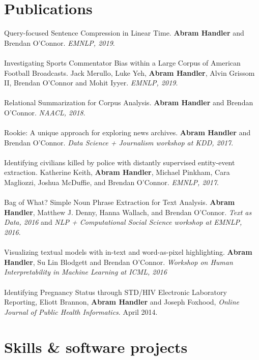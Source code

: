 \documentclass[10pt, a4paper]{article}
\begin{document}
\vspace{-.7cm}

\section*{Publications}

Query-focused Sentence Compression in Linear Time. \textbf{Abram Handler} and Brendan O'Connor. \textit{EMNLP, 2019}.\\ \\
Investigating Sports Commentator Bias within a Large Corpus of American Football Broadcasts. Jack Merullo, Luke Yeh, \textbf{Abram Handler}, Alvin Grissom II, Brendan O'Connor and Mohit Iyyer. \textit{EMNLP, 2019}.\\ \\
Relational Summarization for Corpus Analysis. \textbf{Abram Handler} and Brendan O'Connor. \textit{NAACL, 2018}.\\ \\
Rookie: A unique approach for exploring news archives. \textbf{Abram Handler} and Brendan O'Connor. \textit{Data Science + Journalism workshop at KDD, 2017}.\\ \\
Identifying civilians killed by police with distantly supervised entity-event extraction. Katherine Keith, \textbf{Abram Handler}, Michael Pinkham, Cara Magliozzi, Joshua McDuffie, and Brendan O'Connor. \textit{EMNLP, 2017}. \\ \\
Bag of What? Simple Noun Phrase Extraction for Text Analysis. \textbf{Abram Handler}, Matthew J. Denny, Hanna Wallach, and Brendan O'Connor. \textit{Text as Data, 2016} and \textit{NLP + Computational Social Science workshop at EMNLP, 2016}.\\ \\
Visualizing textual models with in-text and word-as-pixel highlighting.  \textbf{Abram Handler}, Su Lin Blodgett and Brendan O'Connor. \textit{Workshop on Human Interpretability in Machine Learning at ICML, 2016} \\ \\
Identifying Pregnancy Status through STD/HIV Electronic Laboratory Reporting,  Eliott Brannon, \textbf{Abram Handler} and Joseph Foxhood, \textit{Online Journal of Public Health Informatics}. April 2014.

\section*{Skills \& software projects}
\end{document}
